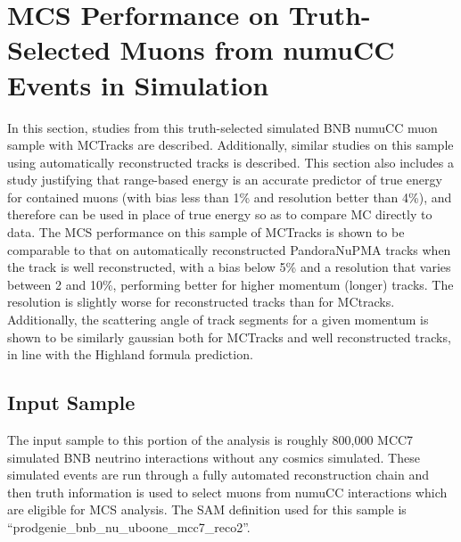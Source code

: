 
\section{MCS Performance on Truth-Selected Muons from numuCC Events in Simulation}\label{MCBNB_performance_section}


In this section, studies from this truth-selected simulated BNB numuCC muon sample with {\sc MCTracks} are described. Additionally, similar studies on this sample using automatically reconstructed tracks is described. This section also includes a study justifying that range-based energy is an accurate predictor of true energy for contained muons (with bias less than 1\% and resolution better than 4\%), and therefore can be used in place of true energy so as to compare MC directly to data. The MCS performance on this sample of {\sc MCTracks} is shown to be comparable to that on automatically reconstructed PandoraNuPMA tracks when the track is well reconstructed, with a bias below 5\% and a resolution that varies between 2 and 10\%, performing better for higher momentum (longer) tracks. The resolution is slightly worse for reconstructed tracks than for {\sc MCtracks}. Additionally, the scattering angle of track segments for a given momentum is shown to be similarly gaussian both for {\sc MCTracks} and well reconstructed tracks, in line with the Highland formula prediction.

\subsection{Input Sample}\label{MCBNB_input_sample_section}
The input sample to this portion of the analysis is roughly 800,000 MCC7 simulated BNB neutrino interactions without any cosmics simulated. These simulated events are run through a fully automated reconstruction chain and then truth information is used to select muons from numuCC interactions which are eligible for MCS analysis. The SAM definition used for this sample is ``prodgenie\_bnb\_nu\_uboone\_mcc7\_reco2''.


